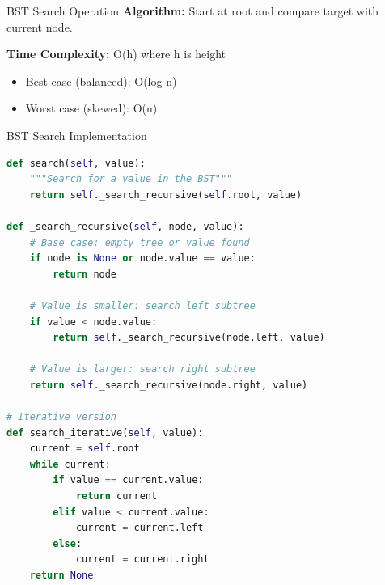 \documentclass[aspectratio=169]{beamer}
\begin{document}
\begin{frame}{BST Search Operation}
  \textbf{Algorithm:} Start at root and compare target with current node.

  \vspace{0.3cm}
  \begin{center}
  \end{center}

  \textbf{Time Complexity:} O(h) where h is height
  \begin{itemize}
    \item Best case (balanced): O(log n)
    \item Worst case (skewed): O(n)
  \end{itemize}
\end{frame}

\begin{frame}[fragile]{BST Search Implementation}
  \begin{lstlisting}[language=Python, basicstyle=\ttfamily\small]
def search(self, value):
    """Search for a value in the BST"""
    return self._search_recursive(self.root, value)

def _search_recursive(self, node, value):
    # Base case: empty tree or value found
    if node is None or node.value == value:
        return node

    # Value is smaller: search left subtree
    if value < node.value:
        return self._search_recursive(node.left, value)

    # Value is larger: search right subtree
    return self._search_recursive(node.right, value)

# Iterative version
def search_iterative(self, value):
    current = self.root
    while current:
        if value == current.value:
            return current
        elif value < current.value:
            current = current.left
        else:
            current = current.right
    return None
  \end{lstlisting}
\end{frame}
\end{document}
